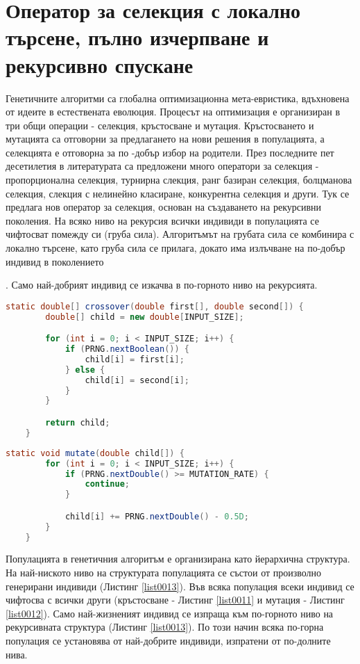 \section{Оператор за селекция с локално търсене, пълно изчерпване и рекурсивно спускане}

Генетичните алгоритми са глобална оптимизационна мета-евристика, вдъхновена от идеите в естествената еволюция. Процесът на оптимизация е организиран в три общи операции - селекция, кръстосване и мутация. Кръстосването и мутацията са отговорни за предлагането на нови решения в популацията, а селекцията е отговорна за по -добър избор на родители. През последните пет десетилетия в литературата са предложени много оператори за селекция - пропорционална селекция, турнирна слекция, ранг базиран селекция, болцманова селекция, слекция с нелинейно класиране, конкурентна селекция и други. Тук се предлага нов оператор за селекция, основан на създаването на рекурсивни поколения. На всяко ниво на рекурсия всички индивиди в популацията се чифтосват помежду си (груба сила). Алгоритъмът на грубата сила се комбинира с локално търсене, като груба сила се прилага, докато има излъчване на по-добър индивид в поколението\begin{comment}\cite{Balabanov-01}\end{comment}. Само най-добрият индивид се изкачва в по-горното ниво на рекурсията. 

\begin{lstlisting}[caption=Равномерно кръстосване, language=Java, basicstyle=\tiny, label=list0011]
	static double[] crossover(double first[], double second[]) {
		double[] child = new double[INPUT_SIZE];

		for (int i = 0; i < INPUT_SIZE; i++) {
			if (PRNG.nextBoolean()) {
				child[i] = first[i];
			} else {
				child[i] = second[i];
			}
		}

		return child;
	}
\end{lstlisting}

\begin{lstlisting}[caption=Мутация със случайно число, language=Java, basicstyle=\tiny, label=list0012]
	static void mutate(double child[]) {
		for (int i = 0; i < INPUT_SIZE; i++) {
			if (PRNG.nextDouble() >= MUTATION_RATE) {
				continue;
			}

			child[i] += PRNG.nextDouble() - 0.5D;
		}
	}
\end{lstlisting}

Популацията в генетичния алгоритъм е организирана като йерархична структура. На най-ниското ниво на структурата популацията се състои от произволно генерирани индивиди (Листинг \ref{list0013}). Във всяка популация всеки индивид се чифтосва с всички други (кръстосване - Листинг \ref{list0011} и мутация - Листинг \ref{list0012}). Само най-жизненият индивид се изпраща към по-горното ниво на рекурсивната структура (Листинг \ref{list0013}). По този начин всяка по-горна популация се установява от най-добрите индивиди, изпратени от по-долните нива.
\pagebreak

